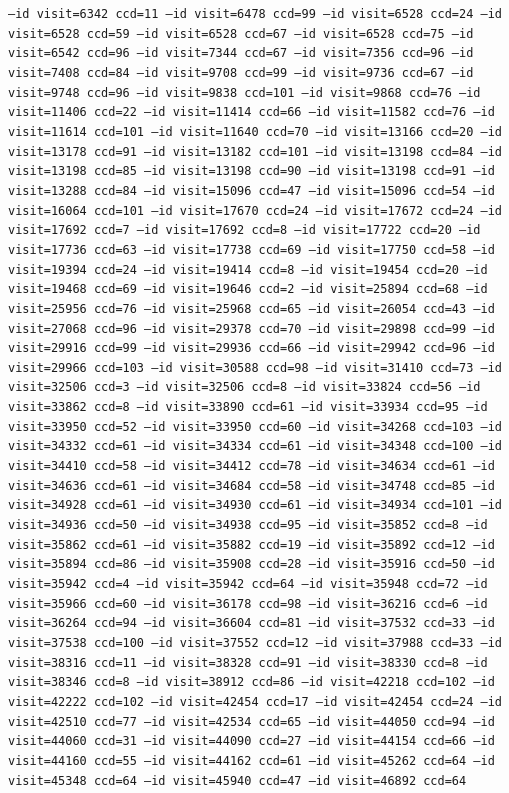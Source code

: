 \texttt{--id visit=6342 ccd=11 --id visit=6478 ccd=99 --id visit=6528 ccd=24 --id visit=6528 ccd=59 --id visit=6528 ccd=67 --id visit=6528 ccd=75 --id visit=6542 ccd=96 --id visit=7344 ccd=67 --id visit=7356 ccd=96 --id visit=7408 ccd=84 --id visit=9708 ccd=99 --id visit=9736 ccd=67 --id visit=9748 ccd=96 --id visit=9838 ccd=101 --id visit=9868 ccd=76 --id visit=11406 ccd=22 --id visit=11414 ccd=66 --id visit=11582 ccd=76 --id visit=11614 ccd=101 --id visit=11640 ccd=70 --id visit=13166 ccd=20 --id visit=13178 ccd=91 --id visit=13182 ccd=101 --id visit=13198 ccd=84 --id visit=13198 ccd=85 --id visit=13198 ccd=90 --id visit=13198 ccd=91 --id visit=13288 ccd=84 --id visit=15096 ccd=47 --id visit=15096 ccd=54 --id visit=16064 ccd=101 --id visit=17670 ccd=24 --id visit=17672 ccd=24 --id visit=17692 ccd=7 --id visit=17692 ccd=8 --id visit=17722 ccd=20 --id visit=17736 ccd=63 --id visit=17738 ccd=69 --id visit=17750 ccd=58 --id visit=19394 ccd=24 --id visit=19414 ccd=8 --id visit=19454 ccd=20 --id visit=19468 ccd=69 --id visit=19646 ccd=2 --id visit=25894 ccd=68 --id visit=25956 ccd=76 --id visit=25968 ccd=65 --id visit=26054 ccd=43 --id visit=27068 ccd=96 --id visit=29378 ccd=70 --id visit=29898 ccd=99 --id visit=29916 ccd=99 --id visit=29936 ccd=66 --id visit=29942 ccd=96 --id visit=29966 ccd=103 --id visit=30588 ccd=98 --id visit=31410 ccd=73 --id visit=32506 ccd=3 --id visit=32506 ccd=8 --id visit=33824 ccd=56 --id visit=33862 ccd=8 --id visit=33890 ccd=61 --id visit=33934 ccd=95 --id visit=33950 ccd=52 --id visit=33950 ccd=60 --id visit=34268 ccd=103 --id visit=34332 ccd=61 --id visit=34334 ccd=61 --id visit=34348 ccd=100 --id visit=34410 ccd=58 --id visit=34412 ccd=78 --id visit=34634 ccd=61 --id visit=34636 ccd=61 --id visit=34684 ccd=58 --id visit=34748 ccd=85 --id visit=34928 ccd=61 --id visit=34930 ccd=61 --id visit=34934 ccd=101 --id visit=34936 ccd=50 --id visit=34938 ccd=95 --id visit=35852 ccd=8 --id visit=35862 ccd=61 --id visit=35882 ccd=19 --id visit=35892 ccd=12 --id visit=35894 ccd=86 --id visit=35908 ccd=28 --id visit=35916 ccd=50 --id visit=35942 ccd=4 --id visit=35942 ccd=64 --id visit=35948 ccd=72 --id visit=35966 ccd=60 --id visit=36178 ccd=98 --id visit=36216 ccd=6 --id visit=36264 ccd=94 --id visit=36604 ccd=81 --id visit=37532 ccd=33 --id visit=37538 ccd=100 --id visit=37552 ccd=12 --id visit=37988 ccd=33 --id visit=38316 ccd=11 --id visit=38328 ccd=91 --id visit=38330 ccd=8 --id visit=38346 ccd=8 --id visit=38912 ccd=86 --id visit=42218 ccd=102 --id visit=42222 ccd=102 --id visit=42454 ccd=17 --id visit=42454 ccd=24 --id visit=42510 ccd=77 --id visit=42534 ccd=65 --id visit=44050 ccd=94 --id visit=44060 ccd=31 --id visit=44090 ccd=27 --id visit=44154 ccd=66 --id visit=44160 ccd=55 --id visit=44162 ccd=61 --id visit=45262 ccd=64 --id visit=45348 ccd=64 --id visit=45940 ccd=47 --id visit=46892 ccd=64}

